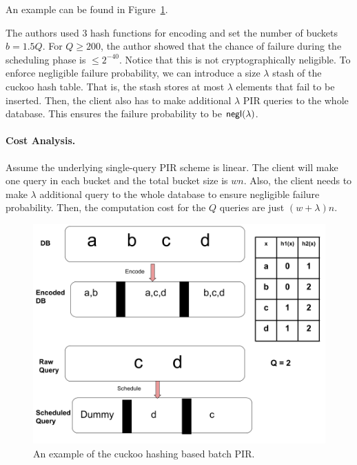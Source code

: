 An example can be found in Figure~\ref{fig:sealpir}.
   
The authors used 3 hash functions for encoding and set the number of buckets $b = 1.5Q$. For $Q\geq 200$, the author showed that the chance of failure during
the scheduling phase is $\leq 2^{-40}$.
Notice that this is not cryptographically neligible. 
To enforce negligible failure probability, we can introduce a size $\lambda$ stash of the cuckoo hash table.
That is, the stash stores at most $\lambda$ elements that fail to be inserted. 
Then, the client also has to make additional $\lambda$ PIR queries to the whole database.
This ensures the failure probability to be ${\sf negl}(\lambda)$.

\paragraph{Cost Analysis.} 
Assume the underlying single-query PIR scheme is linear.
The client will make one query in each bucket and the total bucket size is $wn$.
Also, the client needs to make $\lambda$ additional query to the whole database to ensure negligible failure probability.
Then, the computation cost for the $Q$ queries are just $(w+\lambda)n$.

    
    
\begin{figure}
    \includegraphics[scale=0.45]{scribimg_batchpir.png}
    \caption{An example of the cuckoo hashing based batch PIR. \label{fig:sealpir}}
\end{figure}












